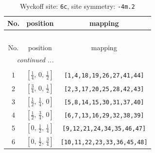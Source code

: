 \documentclass[fleqn,8pt]{jsarticle}
\begin{document}
\renewcommand{\arraystretch}{1.2}
\begin{longtable}{ccc}
\caption{Wyckoff site: {\tt 6c}, site symmetry: {\tt -4m.2}}
 \\
 \hline \hline
No. & position & mapping \\ \hline \endfirsthead

\multicolumn{2}{l}{\tablename\ \thetable{}} \\
 \hline \hline
No. & position & mapping \\ \hline \endhead

 \hline \hline
\multicolumn{2}{r}{\footnotesize\it continued ...} \\ \endfoot

 \hline \hline
\multicolumn{2}{r}{} \\ \endlastfoot

1 & $\left[ \frac{1}{4},\, 0,\, \frac{1}{2} \right]$ & {\tt [1,4,18,19,26,27,41,44]} \\ \hline
2 & $\left[ \frac{3}{4},\, 0,\, \frac{1}{2} \right]$ & {\tt [2,3,17,20,25,28,42,43]} \\ \hline
3 & $\left[ \frac{1}{2},\, \frac{1}{4},\, 0 \right]$ & {\tt [5,8,14,15,30,31,37,40]} \\ \hline
4 & $\left[ \frac{1}{2},\, \frac{3}{4},\, 0 \right]$ & {\tt [6,7,13,16,29,32,38,39]} \\ \hline
5 & $\left[ 0,\, \frac{1}{2},\, \frac{1}{4} \right]$ & {\tt [9,12,21,24,34,35,46,47]} \\ \hline
6 & $\left[ 0,\, \frac{1}{2},\, \frac{3}{4} \right]$ & {\tt [10,11,22,23,33,36,45,48]} \\
\end{longtable}
\renewcommand{\arraystretch}{1.2}
\end{document}
